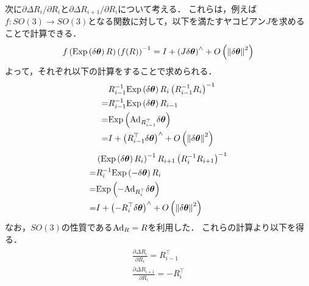 次に$\partial \Delta R_{i} / \partial R_{i}$と$\partial \Delta R_{i+1} / \partial R_{i}$について考える．
これらは，例えば$f : SO(3) \rightarrow SO(3)$となる関数に対して，以下を満たすヤコビアン$J$を求めることで計算できる．
\begin{align}
  f \left( {\rm Exp} \left( \delta \boldsymbol \theta \right) R \right) \left( f(R) \right)^{-1} = I + \left( J \delta \boldsymbol \theta \right)^{\wedge} + O \left( \left\| \delta \boldsymbol \theta \right\|^{2} \right)
\end{align}
%
よって，それぞれ以下の計算をすることで求められる．
%
\begin{align}
  \begin{split}
    & R_{i-1}^{-1} {\rm Exp} \left( \delta \boldsymbol \theta \right) R_{i} \left( R_{i-1}^{-1} R_{i} \right)^{-1} \\
    = & R_{i-1}^{-1} {\rm Exp} \left( \delta \boldsymbol \theta \right) R_{i-1} \\
    = & {\rm Exp} \left( {\rm Ad}_{ R_{i-1}^{\top} } \delta \boldsymbol \theta \right) \\
    = & I + \left( R_{i-1}^{\top} \delta \boldsymbol \theta \right)^{\wedge} + O \left( \left\| \delta \boldsymbol \theta \right\|^{2} \right)
  \end{split}
\end{align}
%
\begin{align}
  \begin{split}
    & \left( {\rm Exp} \left( \delta \boldsymbol \theta \right) R_{i} \right)^{-1} R_{i+1} \left( R_{i}^{-1} R_{i+1} \right)^{-1} \\
    = & R_{i}^{-1} {\rm Exp} \left( -\delta \boldsymbol \theta \right) R_{i} \\
    = & {\rm Exp} \left( -{\rm Ad}_{ R_{i}^{\top} } \delta \boldsymbol \theta \right) \\
    = & I + \left( -R_{i}^{\top} \delta \boldsymbol \theta \right)^{\wedge} + O \left( \left\| \delta \boldsymbol \theta \right\|^{2} \right)
  \end{split}
\end{align}
%
なお，$SO(3)$の性質である${\rm Ad}_{R} = R$を利用した．
これらの計算より以下を得る．
%
\begin{align}
  \begin{gathered}
    \frac{ \partial \Delta R_{i} }{ \partial R_{i} } = R_{i-1}^{\top} \\
    \frac{ \partial \Delta R_{i+1} }{ \partial R_{i} } = -R_{i}^{\top} \\
  \end{gathered}
\end{align}

